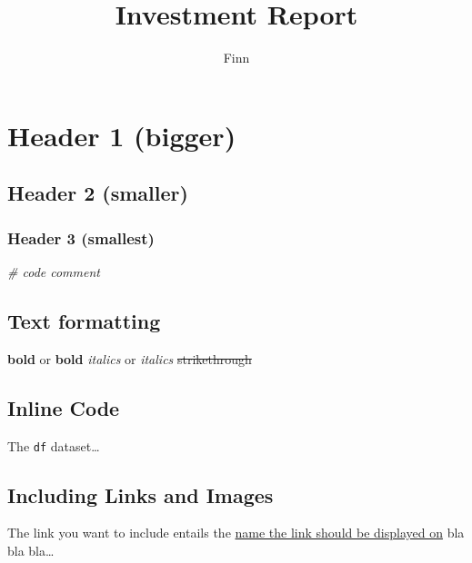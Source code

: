 \documentclass[
]{article}
\title{Investment Report}
\author{Finn}
\date{}
\newenvironment{Shaded}{\begin{snugshade}}{\end{snugshade}}
\newcommand{\CommentTok}[1]{\textcolor[rgb]{0.56,0.35,0.01}{\textit{#1}}}
\begin{document}
\maketitle

\hypertarget{header-1-bigger}{%
\section{Header 1 (bigger)}\label{header-1-bigger}}

\hypertarget{header-2-smaller}{%
\subsection{Header 2 (smaller)}\label{header-2-smaller}}

\hypertarget{header-3-smallest}{%
\subsubsection{Header 3 (smallest)}\label{header-3-smallest}}

\begin{Shaded}
\begin{Highlighting}[]
\CommentTok{\# code comment}
\end{Highlighting}
\end{Shaded}

\hypertarget{text-formatting}{%
\subsection{Text formatting}\label{text-formatting}}

\textbf{bold} or \textbf{bold} \emph{italics} or \emph{italics}
\sout{strikethrough}

\hypertarget{inline-code}{%
\subsection{Inline Code}\label{inline-code}}

The \texttt{df} dataset\ldots{}

\hypertarget{including-links-and-images}{%
\subsection{Including Links and
Images}\label{including-links-and-images}}

The link you want to include entails the \href{the/actual/link}{name the
link should be displayed on} bla bla bla\ldots{}
\end{document}
